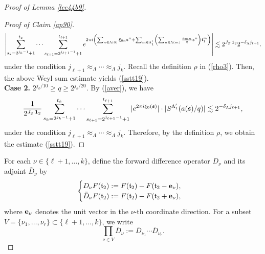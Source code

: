 \documentclass[11 pt,letterpaper]{amsart}
\theoremstyle{plain}
\theoremstyle{definition}
\theoremstyle{remark} \theoremstyle{exam} \theoremstyle{ob}
\numberwithin{equation}{section}
\begin{document}
\begin{proof}[Proof of Lemma \ref{lee44b9}]
\begin{proof}[Proof of Claim \ref{ap90}]
	\begin{align*}
		\left|\sum_{s_k=2^{j_k-1}+1}^{t_k} \cdots \sum_{s_{\ell+1}=2^{j_{\ell+1}-1}+1}^{t_{\ell+1}}  e^{2\pi i\left( \sum_{n\in \Lambda(0)} \xi_{0n}\mathfrak{s}^n+ \sum_{m\in \Lambda_1'}\left(\sum_{n\in \Lambda(m)} \frac{a_{mn}}{q}\mathfrak{s}^n\right)\mathfrak{t}_1^{m}  \right)}\right|
		\lesssim 2^{J_2\cdot {\bf 1}_2}2^{-\delta_{\Lambda} j_{\ell+1}}.
	\end{align*} under the condition $j_{\ell+1}\approx_{\Lambda} \cdots \approx_{\Lambda} j_{k}$.  Recall the definition  $\rho$ in  (\ref{rho3}). Then, the above Weyl sum estimate yields (\ref{sstt19}). 
	\\
	\textbf{Case 2.}  $2^{j_k/10}\ge q\ge 2^{ j_k/20}$. By (\ref{aver}),  we have
	$$\frac{1}{2^{J_2\cdot {\bf 1}_2}}\sum_{s_k=2^{j_k-1}+1}^{t_k} \cdots \sum_{s_{\ell+1}=2^{j_{\ell+1}-1}+1}^{t_{\ell+1}} |e^{2\pi i \xi_0(\mathfrak{s})}|\cdot |S^{\Lambda'_1}(a(\mathfrak{s})/q)|\lesssim 2^{-\delta_{\Lambda}j_{\ell+1}},$$  under the condition $j_{\ell+1}\approx_{\Lambda} \cdots \approx_{\Lambda} j_{k}$. 
	Therefore, by the definition  $\rho$, we  obtain the estimate (\ref{sstt19}).  
\end{proof}


For each $\nu\in \{\ell+1,\dots,k\}$, define the forward difference operator $D_\nu$ and its adjoint $\bar{D}_\nu$ by
\begin{align*}
\begin{cases}
D_\nu F(\mathfrak{t}_2)
:= F(\mathfrak{t}_2)-F(\mathfrak{t}_2-{\bf e}_\nu),\\
\bar{D}_\nu F(\mathfrak{t}_2)
:= F(\mathfrak{t}_2)-F(\mathfrak{t}_2+{\bf e}_\nu),
\end{cases}
\end{align*}
where ${\bf e}_\nu$ denotes the unit vector in the $\nu$-th coordinate direction.  
For a subset $V=\{\nu_1,\dots,\nu_r\}\subset \{\ell+1,\dots,k\}$, we write
\[
\prod_{\nu\in V}\bar{D}_\nu := \bar{D}_{\nu_1}\cdots \bar{D}_{\nu_r}.
\]


\end{proof}
\end{document}
